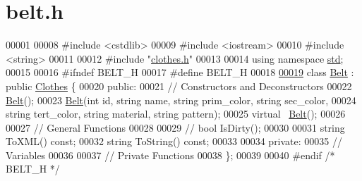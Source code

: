 \hypertarget{belt_8h_source}{}\section{belt.\+h}

\begin{DoxyCode}
00001 
00008 \textcolor{preprocessor}{#include <cstdlib>}
00009 \textcolor{preprocessor}{#include <iostream>}
00010 \textcolor{preprocessor}{#include <string>}
00011 
00012 \textcolor{preprocessor}{#include "\mbox{\hyperlink{clothes_8h}{clothes.h}}"}
00013 
00014 \textcolor{keyword}{using namespace }\mbox{\hyperlink{namespacestd}{std}};
00015 
00016 \textcolor{preprocessor}{#ifndef BELT\_H}
00017 \textcolor{preprocessor}{#define BELT\_H}
00018 
\mbox{\hyperlink{classBelt}{00019}} \textcolor{keyword}{class }\mbox{\hyperlink{classBelt}{Belt}} : \textcolor{keyword}{public} \mbox{\hyperlink{classClothes}{Clothes}} \{
00020  \textcolor{keyword}{public}:
00021   \textcolor{comment}{// Constructors and Deconstructors}
00022   \mbox{\hyperlink{classBelt}{Belt}}();
00023   \mbox{\hyperlink{classBelt}{Belt}}(\textcolor{keywordtype}{int} \textcolor{keywordtype}{id}, \textcolor{keywordtype}{string} name, \textcolor{keywordtype}{string} prim\_color, \textcolor{keywordtype}{string} sec\_color,
00024        \textcolor{keywordtype}{string} tert\_color, \textcolor{keywordtype}{string} material, \textcolor{keywordtype}{string} pattern);
00025   \textcolor{keyword}{virtual} ~\mbox{\hyperlink{classBelt}{Belt}}();
00026 
00027   \textcolor{comment}{// General Functions}
00028 
00029   \textcolor{comment}{// bool IsDirty();}
00030 
00031   \textcolor{keywordtype}{string} ToXML() \textcolor{keyword}{const};
00032   \textcolor{keywordtype}{string} ToString() \textcolor{keyword}{const};
00033 
00034  \textcolor{keyword}{private}:
00035   \textcolor{comment}{// Variables}
00036 
00037   \textcolor{comment}{// Private Functions}
00038 \};
00039 
00040 \textcolor{preprocessor}{#endif }\textcolor{comment}{/* BELT\_H */}\textcolor{preprocessor}{}
\end{DoxyCode}
